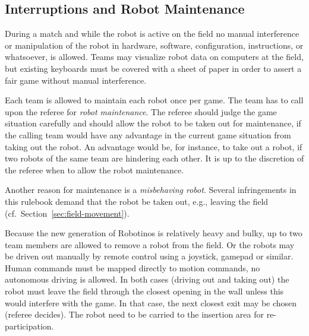 \documentclass[12pt,twoside]{article}
\newcommand{\refsec}[1]{Section~\ref{#1}}
\begin{document}
\subsection{Interruptions and Robot Maintenance}
\label{sec:robot-maintenance}
During a match and while the robot is active on the field no manual
interference or manipulation of the robot in hardware, software,
configuration, instructions, or whatsoever, is allowed.  Teams may
visualize robot data on computers at the field, but existing keyboards
must be covered with a sheet of paper in order to assert a fair game
without manual interference.


Each team is allowed to maintain each robot once per game. The team
has to call upon the referee for \textit{robot maintenance}.  The
referee should judge the game situation carefully and should allow the
robot to be taken out for maintenance, if the calling team would have
any advantage in the current game situation from taking out the
robot. An advantage would be, for instance, to take out a robot, if
two robots of the same team are hindering each other. It is up to the
discretion of the referee when to allow the robot maintenance.

Another reason for maintenance is a \emph{misbehaving robot}. Several
infringements in this rulebook demand that the robot be taken out,
e.g., leaving the field (cf.~\refsec{sec:field-movement}).

Because the new generation of Robotinos is relatively heavy and bulky,
up to two team members are allowed to remove a robot from the field.
Or the robots may be driven out manually by remote control using a
joystick, gamepad or similar. Human commands must be mapped directly
to motion commands, no autonomous driving is allowed. In both cases
(driving out and taking out) the robot must leave the field through
the closest opening in the wall unless this would interfere with the
game. In that case, the next closest exit may be chosen (referee
decides). The robot need to be carried to the insertion area
for re-participation.
\end{document}

